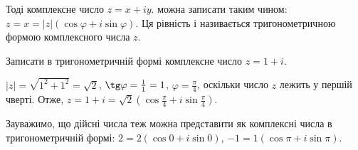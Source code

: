 Тоді комплексне число $z =x +iy$. можна записати таким чином:
$z = x = |z|(\cos\varphi + i\sin\varphi)$. Ця рівність і називається тригонометричною формою
комплексного числа $z$. 

\begin{problem}
	Записати в тригонометричній формі комплексне число $z = 1 + i$.
\end{problem}
\begin{solution}
	$|z| = \sqrt{1^2 + 1^2} = \sqrt{2}$, $\tg\varphi = \frac{1}{1} = 1$, $\varphi = \frac{\pi}{4}$, оскільки число $z$
	лежить у першій чверті. Отже, $z = 1 + i = \sqrt{2}(\cos\frac{\pi}{4} + i\sin\frac{\pi}{4})$.
\end{solution}

Зауважимо, що дійсні числа теж можна представити як комплексні числа в
тригонометричній формі: $2 = 2(\cos 0 + i\sin 0)$, $-1 = 1(\cos \pi + i\sin \pi)$. 

